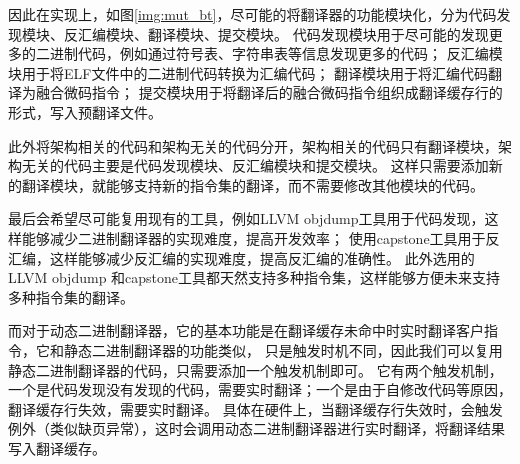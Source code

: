 因此在实现上，如图\ref{img:mut_bt}，尽可能的将翻译器的功能模块化，分为代码发现模块、反汇编模块、翻译模块、提交模块。
代码发现模块用于尽可能的发现更多的二进制代码，例如通过符号表、字符串表等信息发现更多的代码；
反汇编模块用于将ELF文件中的二进制代码转换为汇编代码；
翻译模块用于将汇编代码翻译为融合微码指令；
提交模块用于将翻译后的融合微码指令组织成翻译缓存行的形式，写入预翻译文件。

此外将架构相关的代码和架构无关的代码分开，架构相关的代码只有翻译模块，架构无关的代码主要是代码发现模块、反汇编模块和提交模块。
这样只需要添加新的翻译模块，就能够支持新的指令集的翻译，而不需要修改其他模块的代码。

最后会希望尽可能复用现有的工具，例如LLVM objdump工具用于代码发现，这样能够减少二进制翻译器的实现难度，提高开发效率；
使用capstone工具用于反汇编，这样能够减少反汇编的实现难度，提高反汇编的准确性。
此外选用的LLVM objdump 和capstone工具都天然支持多种指令集，这样能够方便未来支持多种指令集的翻译。


而对于动态二进制翻译器，它的基本功能是在翻译缓存未命中时实时翻译客户指令，它和静态二进制翻译器的功能类似，
只是触发时机不同，因此我们可以复用静态二进制翻译器的代码，只需要添加一个触发机制即可。
它有两个触发机制，一个是代码发现没有发现的代码，需要实时翻译；一个是由于自修改代码等原因，翻译缓存行失效，需要实时翻译。
具体在硬件上，当翻译缓存行失效时，会触发例外（类似缺页异常），这时会调用动态二进制翻译器进行实时翻译，将翻译结果写入翻译缓存。
